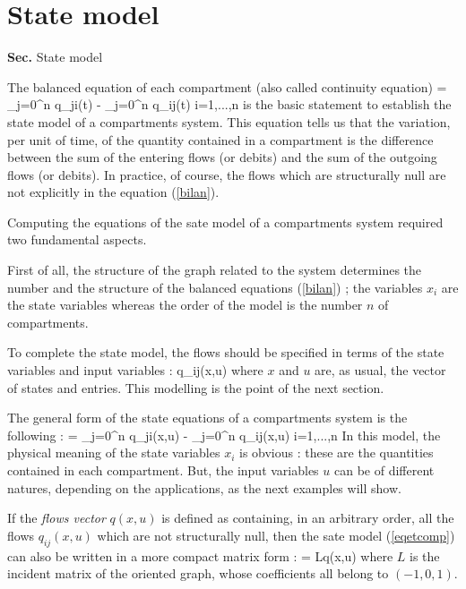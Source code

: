 \section{State model}
 {{ \bf Sec. \thesection} \hfill
State model \hspace*{5mm}}

The balanced equation of each compartment (also called continuity equation)
\eqnn
{} = \sum_{j=0}^n q_{ji}(t) - \sum_{j=0}^n q_{ij}(t) \hspace{1cm} i=1,...,n
\label{bilan}
\eeqnn
is the basic statement to establish the state model of a compartments system.
This equation tells us that the variation, per unit of time, of the 
quantity contained in a compartment is the difference between the 
sum of the entering flows (or debits) and the sum of the outgoing flows (or debits). 
In practice, of course, the flows which are structurally null are not explicitly in the equation  
(\eqref{bilan}).

Computing the equations of the sate model of a compartments system required two 
fundamental aspects. 

First of all, the structure of the graph related to the system determines the 
number and the structure of the balanced equations (\eqref{bilan}) ; the variables $x_i$ are
the state variables whereas the order of the model is the number $n$ of  
compartments.

To complete the state model, the flows should be specified in terms of the 
state variables and input variables : 
\eqnn
q_{ij}(x,u)
\eeqnn
where $x$ and $u$ are, as usual, the vector of states and entries. 
This modelling is the point of the next section.

The general form of the state equations of a compartments system is the 
following :  
\eqnn 
{} = \sum_{j=0}^n q_{ji}(x,u) - \sum_{j=0}^n q_{ij}(x,u) \hspace{1cm} i=1,...,n  \label{eqetcomp}
\eeqnn
In this model, the physical meaning of the state variables $x_i$ is obvious : these are
the quantities contained in each compartment. But, the input variables $u$ can be 
of different natures, depending on the applications, as the next examples will show.

If the {\em flows vector} $q(x,u)$ is defined as containing, in an arbitrary order, all the
flows $q_{ij}(x,u)$ which are not structurally null, then the sate model (\eqref{eqetcomp}) 
can also be written in a more compact matrix form :
\eqn 
{} = Lq(x,u)  \label{modetcomp}
\eeqn
where $L$ is the incident matrix of the oriented graph, whose  
coefficients all belong to 
$(-1,0,1)$.

